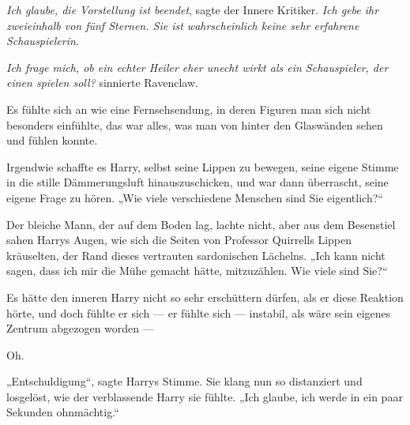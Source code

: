 \emph{Ich glaube, die Vorstellung ist beendet}, sagte der Innere Kritiker. \emph{Ich gebe ihr zweieinhalb von fünf Sternen. Sie ist wahrscheinlich keine sehr erfahrene Schauspielerin.}

\emph{Ich frage mich, ob ein echter Heiler eher unecht wirkt als ein Schauspieler, der einen spielen soll?} sinnierte Ravenclaw.

Es fühlte sich an wie eine Fernsehsendung, in deren Figuren man sich nicht besonders einfühlte, das war alles, was man von hinter den Glaswänden sehen und fühlen konnte.

Irgendwie schaffte es Harry, selbst seine Lippen zu bewegen, seine eigene Stimme in die stille Dämmerungsluft hinauszuschicken, und war dann überrascht, seine eigene Frage zu hören.
„Wie viele verschiedene Menschen sind Sie eigentlich?“

Der bleiche Mann, der auf dem Boden lag, lachte nicht, aber aus dem Besenstiel sahen Harrys Augen, wie sich die Seiten von Professor Quirrells Lippen kräuselten, der Rand dieses vertrauten sardonischen Lächelns.
„Ich kann nicht sagen, dass ich mir die Mühe gemacht hätte, mitzuzählen. Wie viele sind Sie?“

Es hätte den inneren Harry nicht so sehr erschüttern dürfen, als er diese Reaktion hörte, und doch fühlte er sich — er fühlte sich — instabil, als wäre sein eigenes Zentrum abgezogen worden —

Oh.

„Entschuldigung“, sagte Harrys Stimme. Sie klang nun so distanziert und losgelöst, wie der verblassende Harry sie fühlte.
„Ich glaube, ich werde in ein paar Sekunden ohnmächtig.“

